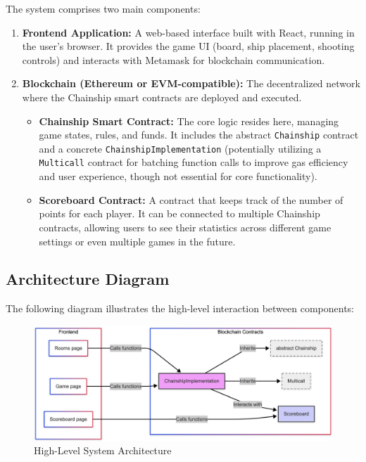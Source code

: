 \documentclass{article}
\begin{document}
    The system comprises two main components:
    \begin{enumerate}
        \item \textbf{Frontend Application:} A web-based interface built with React, running in the user's browser. It provides the game UI (board, ship placement, shooting controls) and interacts with Metamask for blockchain communication.
        \item \textbf{Blockchain (Ethereum or EVM-compatible):} The decentralized network where the Chainship smart contracts are deployed and executed.
            \begin{itemize}
                \item \textbf{Chainship Smart Contract:} The core logic resides here, managing game states, rules, and funds. It includes the abstract \texttt{Chainship} contract and a concrete \texttt{ChainshipImplementation} (potentially utilizing a \texttt{Multicall} contract for batching function calls to improve gas efficiency and user experience, though not essential for core functionality).
                \item \textbf{Scoreboard Contract:} A contract that keeps track of the number of points for each player. It can be connected to multiple Chainship contracts, allowing users to see their statistics across different game settings or even multiple games in the future.
            \end{itemize}
    \end{enumerate}

    \subsection{Architecture Diagram}

    The following diagram illustrates the high-level interaction between components:

    \begin{figure}[H]
        \includegraphics[width=\textwidth]{high-level-architecture.png}
        \caption{High-Level System Architecture}
        \label{fig:architecture}
    \end{figure}
\end{document}
